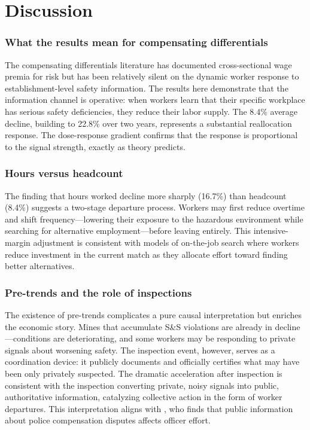 \documentclass[12pt]{article}
\begin{document}
\section{Discussion}

\subsubsection*{What the results mean for compensating differentials} The compensating differentials literature has documented cross-sectional wage premia for risk \citep{viscusi1979employment, kniesner2014compensating} but has been relatively silent on the dynamic worker response to establishment-level safety information. The results here demonstrate that the information channel is operative: when workers learn that their specific workplace has serious safety deficiencies, they reduce their labor supply. The 8.4\% average decline, building to 22.8\% over two years, represents a substantial reallocation response. The dose-response gradient confirms that the response is proportional to the signal strength, exactly as theory predicts.

\subsubsection*{Hours versus headcount} The finding that hours worked decline more sharply (16.7\%) than headcount (8.4\%) suggests a two-stage departure process. Workers may first reduce overtime and shift frequency---lowering their exposure to the hazardous environment while searching for alternative employment---before leaving entirely. This intensive-margin adjustment is consistent with models of on-the-job search where workers reduce investment in the current match as they allocate effort toward finding better alternatives.

\subsubsection*{Pre-trends and the role of inspections} The existence of pre-trends complicates a pure causal interpretation but enriches the economic story. Mines that accumulate S\&S violations are already in decline---conditions are deteriorating, and some workers may be responding to private signals about worsening safety. The inspection event, however, serves as a coordination device: it publicly documents and officially certifies what may have been only privately suspected. The dramatic acceleration after inspection is consistent with the inspection converting private, noisy signals into public, authoritative information, catalyzing collective action in the form of worker departures. This interpretation aligns with \citet{mas2008labour}, who finds that public information about police compensation disputes affects officer effort.
\end{document}
